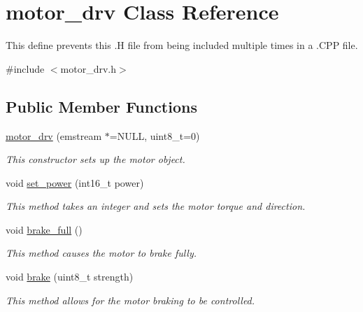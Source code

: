 \hypertarget{classmotor__drv}{\section{motor\-\_\-drv Class Reference}
\label{classmotor__drv}
}


This define prevents this .H file from being included multiple times in a .C\-P\-P file.  




{\ttfamily \#include $<$motor\-\_\-drv.\-h$>$}

\subsection*{Public Member Functions}
\begin{DoxyCompactItemize}
\item 
\hyperlink{classmotor__drv_a13875fc8133ee2c8af383c4316278d84}{motor\-\_\-drv} (emstream $\ast$=N\-U\-L\-L, uint8\-\_\-t=0)
\begin{DoxyCompactList}\small\item\em This constructor sets up the motor object. \end{DoxyCompactList}\item 
void \hyperlink{classmotor__drv_a4b6d6fc9698bf76b9bf1bcbb660ad3b7}{set\-\_\-power} (int16\-\_\-t power)
\begin{DoxyCompactList}\small\item\em This method takes an integer and sets the motor torque and direction. \end{DoxyCompactList}\item 
void \hyperlink{classmotor__drv_ab9d99a1b71f8515240ff7748a16c937b}{brake\-\_\-full} ()
\begin{DoxyCompactList}\small\item\em This method causes the motor to brake fully. \end{DoxyCompactList}\item 
void \hyperlink{classmotor__drv_abf63b3c932b836bc3f97ebda5fd7e762}{brake} (uint8\-\_\-t strength)
\begin{DoxyCompactList}\small\item\em This method allows for the motor braking to be controlled. \end{DoxyCompactList}\end{DoxyCompactItemize}
